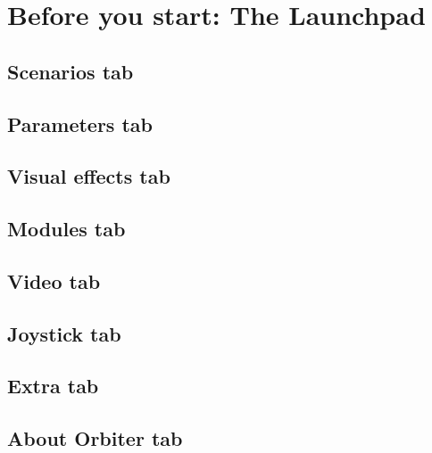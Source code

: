 \documentclass[Orbiter User Manual.tex]{subfiles}
\begin{document}
\section{Before you start: The Launchpad}

\subsection{Scenarios tab}

\subsection{Parameters tab}

\subsection{Visual effects tab}

\subsection{Modules tab}

\subsection{Video tab}

\subsection{Joystick tab}

\subsection{Extra tab}

\subsection{About Orbiter tab}
\end{document}
